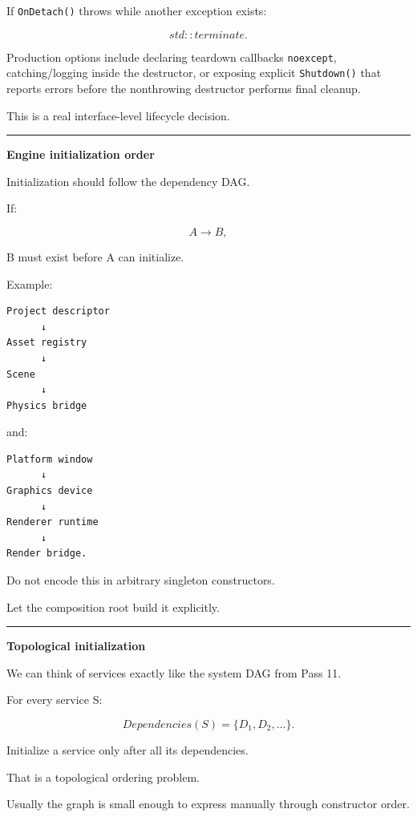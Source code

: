 If \texttt{OnDetach()} throws while another exception exists:

\[
std::terminate.
\]

Production options include declaring teardown callbacks \texttt{noexcept}, catching/logging inside the destructor, or exposing explicit \texttt{Shutdown()} that reports errors before the nonthrowing destructor performs final cleanup.

This is a real interface-level lifecycle decision.

\begin{center}\rule{0.5\linewidth}{0.5pt}\end{center}

\textbf{Engine initialization order}

Initialization should follow the dependency DAG.

If:

\[
A\rightarrow B,
\]

B must exist before A can initialize.

Example:

\begin{verbatim}
Project descriptor
      ↓
Asset registry
      ↓
Scene
      ↓
Physics bridge
\end{verbatim}

and:

\begin{verbatim}
Platform window
      ↓
Graphics device
      ↓
Renderer runtime
      ↓
Render bridge.
\end{verbatim}

Do not encode this in arbitrary singleton constructors.

Let the composition root build it explicitly.

\begin{center}\rule{0.5\linewidth}{0.5pt}\end{center}

\textbf{Topological initialization}

We can think of services exactly like the system DAG from Pass 11.

For every service S:

\[
Dependencies(S)=\{D_1,D_2,\dots\}.
\]

Initialize a service only after all its dependencies.

That is a topological ordering problem.

Usually the graph is small enough to express manually through constructor order.

